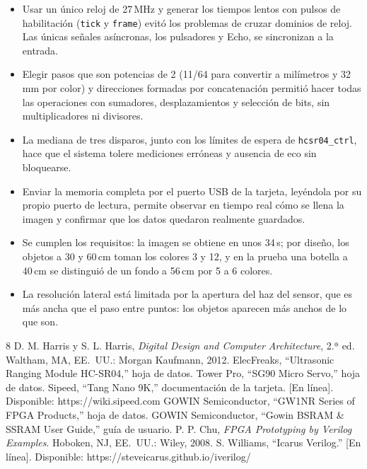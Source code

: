 \documentclass[conference]{IEEEtran}
\newcommand{\mo}[1]{\texttt{#1}}
\begin{document}
\begin{itemize}
\item Usar un único reloj de 27\,MHz y generar los tiempos lentos con pulsos de habilitación (\mo{tick} y \mo{frame}) evitó los problemas de cruzar dominios de reloj. Las únicas señales asíncronas, los pulsadores y Echo, se sincronizan a la entrada.
\item Elegir pasos que son potencias de 2 (11/64 para convertir a milímetros y 32\,mm por color) y direcciones formadas por concatenación permitió hacer todas las operaciones con sumadores, desplazamientos y selección de bits, sin multiplicadores ni divisores.
\item La mediana de tres disparos, junto con los límites de espera de \mo{hcsr04\_ctrl}, hace que el sistema tolere mediciones erróneas y ausencia de eco sin bloquearse.
\item Enviar la memoria completa por el puerto USB de la tarjeta, leyéndola por su propio puerto de lectura, permite observar en tiempo real cómo se llena la imagen y confirmar que los datos quedaron realmente guardados.
\item Se cumplen los requisitos: la imagen se obtiene en unos 34\,s; por diseño, los objetos a 30 y 60\,cm toman los colores 3 y 12, y en la prueba una botella a 40\,cm se distinguió de un fondo a 56\,cm por 5 a 6 colores.
\item La resolución lateral está limitada por la apertura del haz del sensor, que es más ancha que el paso entre puntos: los objetos aparecen más anchos de lo que son.
\end{itemize}

\begin{thebibliography}{8}
 D. M. Harris y S. L. Harris, \emph{Digital Design and Computer Architecture}, 2.ª ed. Waltham, MA, EE.~UU.: Morgan Kaufmann, 2012.
 ElecFreaks, ``Ultrasonic Ranging Module HC-SR04,'' hoja de datos.
 Tower Pro, ``SG90 Micro Servo,'' hoja de datos.
 Sipeed, ``Tang Nano 9K,'' documentación de la tarjeta. [En línea]. Disponible: https://wiki.sipeed.com
 GOWIN Semiconductor, ``GW1NR Series of FPGA Products,'' hoja de datos.
 GOWIN Semiconductor, ``Gowin BSRAM \& SSRAM User Guide,'' guía de usuario.
 P. P. Chu, \emph{FPGA Prototyping by Verilog Examples}. Hoboken, NJ, EE.~UU.: Wiley, 2008.
 S. Williams, ``Icarus Verilog.'' [En línea]. Disponible: https://steveicarus.github.io/iverilog/
\end{thebibliography}
\end{document}
